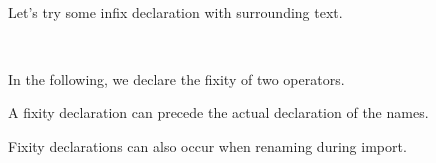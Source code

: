 \documentclass{article}
\begin{document}
\begin{code}%
\>[0]\AgdaSpace{}%
\AgdaSpace{}%
\<%
\\
%
\\[\AgdaEmptyExtraSkip]%
\>[0]\AgdaSpace{}%
\AgdaSpace{}%
\AgdaOperator{\AgdaDatatype{\AgdaUnderscore{}>>\AgdaUnderscore{}}}\AgdaSpace{}%
\AgdaOperator{\AgdaDatatype{\AgdaUnderscore{}<<\AgdaUnderscore{}}}\<%
\\
%
\\[\AgdaEmptyExtraSkip]%
\>[0]\AgdaSpace{}%
\AgdaOperator{\AgdaDatatype{\AgdaUnderscore{}>>\AgdaUnderscore{}}}\AgdaSpace{}%
\AgdaSymbol{:}\AgdaSpace{}%
\AgdaSpace{}%
\<%
\\
\>[0]\AgdaSpace{}%
\AgdaOperator{\AgdaDatatype{\AgdaUnderscore{}<<\AgdaUnderscore{}}}\AgdaSpace{}%
\AgdaSymbol{:}\AgdaSpace{}%
\AgdaSpace{}%
\<%
\\
\>[0]\<%
\end{code}

Let's try some infix declaration with surrounding text.

\begin{code}%
\>[0]\AgdaSpace{}%
\AgdaSpace{}%
\<%
\\
\>[0]\<%
\end{code}

In the following, we declare the fixity of two operators.

\begin{code}%
\>[0][@{}l@{\AgdaIndent{1}}]%
\>[2]\AgdaSpace{}%
\AgdaSpace{}%
\AgdaOperator{\AgdaPostulate{\AgdaUnderscore{}+\AgdaUnderscore{}}}\AgdaSpace{}%
\AgdaOperator{\AgdaPostulate{\AgdaUnderscore{}*\AgdaUnderscore{}}}\<%
\end{code}

A fixity declaration can precede the actual declaration of the names.

\begin{code}%
%
\>[2]\AgdaSpace{}%
\AgdaOperator{\AgdaPostulate{\AgdaUnderscore{}+\AgdaUnderscore{}}}\AgdaSpace{}%
\AgdaOperator{\AgdaPostulate{\AgdaUnderscore{}*\AgdaUnderscore{}}}\AgdaSpace{}%
\AgdaSymbol{:}\AgdaSpace{}%
\<%
\end{code}

Fixity declarations can also occur when renaming during import.
\end{document}
